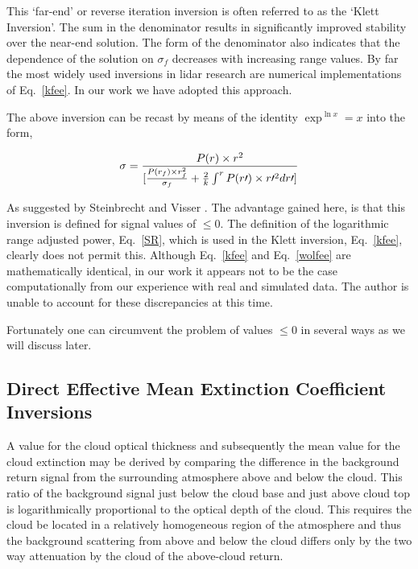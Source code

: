 This `far-end' or reverse iteration inversion is often referred to as 
the `Klett Inversion'. The sum in the denominator results in 
significantly improved stability over the near-end solution. 
The form of the denominator also indicates
that the dependence of the solution on ${\sigma_f}$ decreases with increasing
range values. By far the most widely used inversions in lidar research
are numerical implementations of Eq.~{\ref{kfee}}. In our work
we have adopted this approach.

The above inversion can 
be recast by means of the identity ${\exp^{\ln x}}=x$ 
into the form,

\begin{equation}
{\sigma} 
= 
{{{P(r)} \times {r^{2}}}
\over 
{[
{
{{P(r_f)} \times {r_{f}^{2}}} 
\over 
\sigma_f
}
+{{2\over{k}} \int^r 
{
{P(r\prime)} \times {r\prime^{2}}
} 
dr\prime} 
]}} 
\label{wolfee}
\end{equation}

As suggested by Steinbrecht and Visser \cite{evpd}\cite{ws}. 
The advantage gained here, is 
that this inversion is defined for signal values of $\leq 0$. The
definition of the logarithmic range adjusted power,
Eq.~{\ref{SR}}, which is used in the Klett inversion, 
Eq.~{\ref{kfee}}, clearly does not permit this. 
Although Eq.~{\ref{kfee}} and Eq.~{\ref{wolfee}} are mathematically
identical, in our work it appears not to be the case
computationally from our experience with real and simulated data.
The author is unable to account for these discrepancies at this time.

Fortunately one can circumvent the problem of values $\leq 0$ in several ways
as we will discuss later.

\subsection{Direct Effective Mean Extinction Coefficient Inversions}

A value for the cloud optical thickness and subsequently
the mean value for the cloud extinction may be derived 
by comparing the difference in the background return signal from the 
surrounding atmosphere above and below the cloud.
This ratio of the background signal just below the cloud base and
just above cloud top is logarithmically proportional to the 
optical depth of the cloud. This requires the cloud be located in a 
relatively homogeneous region of the atmosphere
and thus the background scattering from above and below 
the cloud differs only by the two way attenuation by the cloud
of the above-cloud return. 

